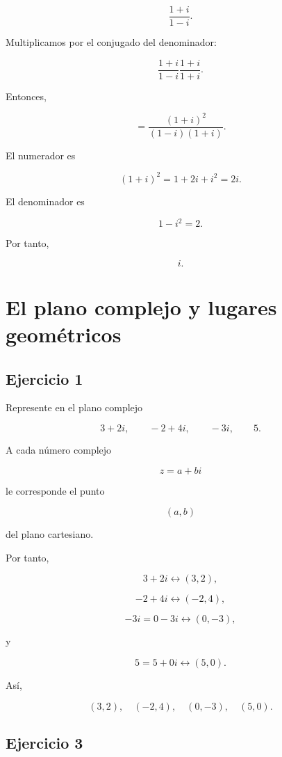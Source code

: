 \documentclass[12pt]{article}
\begin{document}
\[
\frac{1+i}{1-i}.
\]

Multiplicamos por el conjugado del denominador:

\[
\frac{1+i}{1-i}
\frac{1+i}{1+i}.
\]

Entonces,

\[
=
\frac{(1+i)^2}{(1-i)(1+i)}.
\]

El numerador es

\[
(1+i)^2
=
1+2i+i^2
=
2i.
\]

El denominador es

\[
1-i^2=2.
\]

Por tanto,

\[
\boxed{i}.
\]

\section*{El plano complejo y lugares geométricos}

\subsection*{Ejercicio 1}

Represente en el plano complejo

\[
3+2i,\qquad -2+4i,\qquad -3i,\qquad 5.
\]

A cada número complejo

\[
z=a+bi
\]

le corresponde el punto

\[
(a,b)
\]

del plano cartesiano.

Por tanto,

\[
3+2i\longleftrightarrow(3,2),
\]

\[
-2+4i\longleftrightarrow(-2,4),
\]

\[
-3i=0-3i\longleftrightarrow(0,-3),
\]

y

\[
5=5+0i\longleftrightarrow(5,0).
\]

Así,

\[
\boxed{
(3,2),\quad(-2,4),\quad(0,-3),\quad(5,0)
}.
\]


\subsection*{Ejercicio 3}
\end{document}
